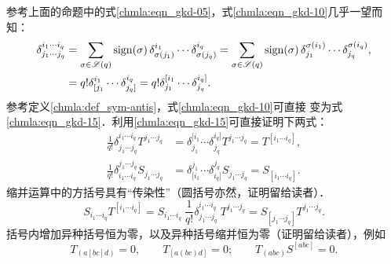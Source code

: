 参考上面的命题中的式\eqref{chmla:eqn_gkd-05}，式\eqref{chmla:eqn_gkd-10}几乎一望而知：
\begin{align}
    \delta^{i_1 \cdots i_q}_{j_1 \cdots j_q}
    &= \sum_{\sigma \in \mathscr{S}(q)} {\rm sign}(\sigma)\,
        \delta^{i_1}_{\sigma(j_1)} \cdots \delta^{i_q}_{\sigma(j_q)}
     = \sum_{\sigma \in \mathscr{S}(q)} {\rm sign}(\sigma)\,
        \delta^{\sigma(i_1)}_{j_1} \cdots \delta^{\sigma(i_q)}_{j_q}, \label{chmla:eqn_gkd-10} \\
    &= q! \delta^{i_1}_{\lbrack j_1} \cdots \delta^{i_q}_{j_q \rbrack}
    = q! \delta^{\lbrack i_1}_{j_1} \cdots \delta^{i_q \rbrack}_{j_q}.  \label{chmla:eqn_gkd-15}
\end{align}
参考定义\ref{chmla:def_sym-antis}，式\eqref{chmla:eqn_gkd-10}可直接
变为式\eqref{chmla:eqn_gkd-15}．利用\eqref{chmla:eqn_gkd-15}可直接证明下两式：
\begin{align}
    \frac{1}{q!}\delta^{i_1 \cdots i_q}_{j_1 \cdots j_q} T^{j_1 \cdots j_q}
    &=\delta^{\lbrack i_1}_{j_1} \cdots \delta^{i_q \rbrack}_{j_q} T^{j_1 \cdots j_q}
    =T^{[i_1 \cdots i_q]} , \label{chmla:eqn_gkd-20} \\
    \frac{1}{q!}\delta_{i_1 \cdots i_q}^{j_1 \cdots j_q} S_{j_1 \cdots j_q}
    &=\delta_{\lbrack i_1}^{j_1} \cdots \delta_{i_q \rbrack}^{j_q} S_{j_1 \cdots j_q}
    =S_{[i_1 \cdots i_q]}  .  \label{chmla:eqn_gkd-25}
\end{align}
缩并运算中的方括号具有“传染性”（圆括号亦然，证明留给读者）．
\begin{equation}\label{chmla:eqn_gkd-30}
    S_{i_1 \cdots i_q} T^{[i_1 \cdots i_q]} = S_{i_1 \cdots i_q} \
    \frac{1}{q!}\delta^{i_1 \cdots i_q}_{j_1 \cdots j_q} \ T^{j_1 \cdots j_q}
    = S_{[j_1 \cdots j_q]} T^{j_1 \cdots j_q} .
\end{equation}
括号内增加异种括号恒为零，以及异种括号缩并恒为零（证明留给读者），例如
\begin{equation}\label{chmla:eqn_gkd-35}
    T_{(a[bc]d)} =0, \qquad  T_{[a(bc)d]} =0 ; \qquad
    T_{(abc)} S^{[abc]} =0 .
\end{equation}

